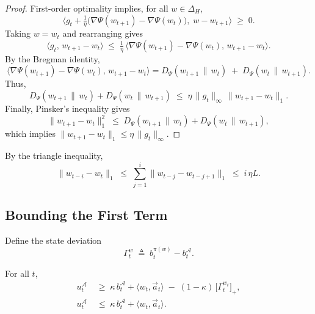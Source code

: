 \begin{proof}
First-order optimality implies, for all \(w\in\Delta_H\),
\[
\Big\langle g_t + \tfrac{1}{\eta}\big(\nabla\Psi(w_{t+1})-\nabla\Psi(w_t)\big),\; w-w_{t+1} \Big\rangle \;\ge\; 0.
\]
Taking \(w=w_t\) and rearranging gives
\[
\langle g_t,\, w_{t+1}-w_t\rangle
\;\le\; \tfrac{1}{\eta}\,\big\langle \nabla\Psi(w_{t+1})-\nabla\Psi(w_t),\, w_{t+1}-w_t\big\rangle.
\]
By the Bregman identity,
\[
\big\langle \nabla\Psi(w_{t+1})-\nabla\Psi(w_t),\, w_{t+1}-w_t\big\rangle
= D_{\Psi}(w_{t+1}\,\|\,w_t)\;+\;D_{\Psi}(w_t\,\|\,w_{t+1}).
\]
Thus,
\[
D_{\Psi}(w_{t+1}\,\|\,w_t)+D_{\Psi}(w_t\,\|\,w_{t+1})
\;\le\; \eta\,\|g_t\|_\infty\,\|w_{t+1}-w_t\|_1.
\]
Finally, Pinsker’s inequality gives
\[
\|w_{t+1}-w_t\|_1^2 \;\le\; D_{\Psi}(w_{t+1}\,\|\,w_t)+D_{\Psi}(w_t\,\|\,w_{t+1}),
\]
which implies
\(\|w_{t+1}-w_t\|_1 \le \eta\,\|g_t\|_\infty\).
\end{proof}

\begin{Thm:Corollary}
\label{cor:cum-move}
By the triangle inequality,
\[
\|w_{t-i}-w_t\|_1
\;\le\;
\sum_{j=1}^i \|w_{t-j}-w_{t-j+1}\|_1
\;\le\; i\,\eta L.
\]
\end{Thm:Corollary}



\subsection{Bounding the First Term}

Define the state deviation
\[
\Gamma_t^{w}\;\triangleq\; b_t^{\pi(w)} - b_t^\mathcal{A}.
\]

\begin{Thm:Lemma}\label{lem:bounding-u-eff}
For all \(t\),
\begin{align}
\label{eq:u-lower-bound-eff}
    u_t^\mathcal{A}
    &\;\ge\;
    \kappa\, b_t^\mathcal{A}+\langle w_t , \vec{a}_t\rangle
    \;-\;
    (1-\kappa)\,\big[\Gamma_t^{w_t}\big]_+ ,\\[4pt]
\label{eq:u-upper-bound-eff}
    u_t^\mathcal{A}
    &\;\le\;
    \kappa\, b_t^\mathcal{A}+\langle w_t , \vec{a}_t\rangle .
\end{align}
\end{Thm:Lemma}

